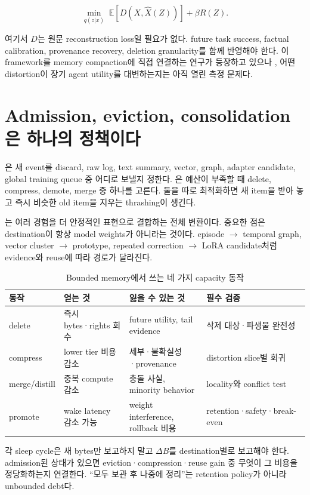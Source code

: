 \begin{equation}
\min_{q(z|x)}\; \mathbb{E}[D(X,\hat X(Z))]+\beta R(Z).
\end{equation}

여기서 $D$는 원문 reconstruction loss일 필요가 없다. future task success, factual calibration,
provenance recovery, deletion granularity를 함께 반영해야 한다. 이 framework를 memory compaction에
직접 연결하는 연구가 등장하고 있으나 \parencite{ratedistortion2026}, 어떤 distortion이 장기 agent
utility를 대변하는지는 아직 열린 측정 문제다.

\section{Admission, eviction, consolidation은 하나의 정책이다}

은 새 event를 discard, raw log, text summary, vector,
graph, adapter candidate, global training queue 중 어디로 보낼지 정한다. 은 예산이 부족할 때 delete, compress, demote, merge 중 하나를 고른다. 둘을 따로 최적화하면
새 item을 받아 놓고 즉시 비슷한 old item을 지우는 thrashing이 생긴다.

는 여러 경험을 더 안정적인 표현으로 결합하는 전체 변환이다. 중요한
점은 destination이 항상 model weights가 아니라는 것이다. episode $\rightarrow$ temporal graph,
vector cluster $\rightarrow$ prototype, repeated correction $\rightarrow$ LoRA candidate처럼 evidence와
reuse에 따라 경로가 달라진다.

\begin{table}[htbp]
\centering
\caption{Bounded memory에서 쓰는 네 가지 capacity 동작}
\label{tab:bg-capacity-actions}
\small
\begin{tabularx}{\textwidth}{p{} X X X}
\toprule
동작 & 얻는 것 & 잃을 수 있는 것 & 필수 검증 \\
\midrule
delete & 즉시 bytes·rights 회수 & future utility, tail evidence & 삭제 대상·파생물 완전성 \\
compress & lower tier 비용 감소 & 세부·불확실성·provenance & distortion slice별 회귀 \\
merge/distill & 중복 compute 감소 & 충돌 사실, minority behavior & locality와 conflict test \\
promote & wake latency 감소 가능 & weight interference, rollback 비용 & retention·safety·break-even \\
\bottomrule
\end{tabularx}
\end{table}

\begin{keypoint}
각 sleep cycle은 새 bytes만 보고하지 말고 $\Delta B$를 destination별로 보고해야 한다. admission된
상태가 있으면 eviction·compression·reuse gain 중 무엇이 그 비용을 정당화하는지 연결한다. ``모두
보관 후 나중에 정리''는 retention policy가 아니라 unbounded debt다.
\end{keypoint}
